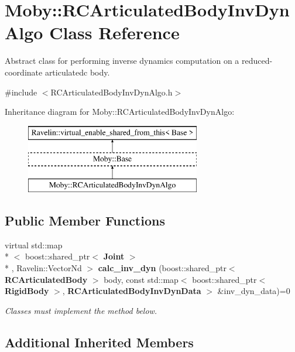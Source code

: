 \section{Moby\-:\-:R\-C\-Articulated\-Body\-Inv\-Dyn\-Algo Class Reference}
\label{classMoby_1_1RCArticulatedBodyInvDynAlgo}


Abstract class for performing inverse dynamics computation on a reduced-\/coordinate articulatedc body.  




{\ttfamily \#include $<$R\-C\-Articulated\-Body\-Inv\-Dyn\-Algo.\-h$>$}

Inheritance diagram for Moby\-:\-:R\-C\-Articulated\-Body\-Inv\-Dyn\-Algo\-:\begin{figure}[H]
\begin{center}
\leavevmode
\includegraphics[height=3.000000cm]{classMoby_1_1RCArticulatedBodyInvDynAlgo}
\end{center}
\end{figure}
\subsection*{Public Member Functions}
\begin{DoxyCompactItemize}
\item 
virtual std\-::map\\*
$<$ boost\-::shared\-\_\-ptr$<$ {\bf Joint} $>$\\*
, Ravelin\-::\-Vector\-Nd $>$ {\bf calc\-\_\-inv\-\_\-dyn} (boost\-::shared\-\_\-ptr$<$ {\bf R\-C\-Articulated\-Body} $>$ body, const std\-::map$<$ boost\-::shared\-\_\-ptr$<$ {\bf Rigid\-Body} $>$, {\bf R\-C\-Articulated\-Body\-Inv\-Dyn\-Data} $>$ \&inv\-\_\-dyn\-\_\-data)=0
\begin{DoxyCompactList}\small\item\em Classes must implement the method below. \end{DoxyCompactList}\end{DoxyCompactItemize}
\subsection*{Additional Inherited Members}


